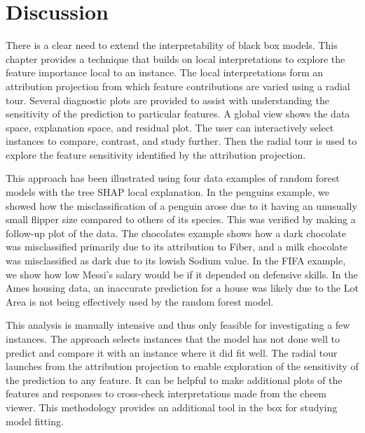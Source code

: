 \documentclass[11pt,twoside]{article}
\begin{document}
\hypertarget{sec:cheemdiscussion}{%
\section{Discussion}\label{sec:cheemdiscussion}}

There is a clear need to extend the interpretability of black box models. This chapter provides a technique that builds on local interpretations to explore the feature importance local to an instance. The local interpretations form an attribution projection from which feature contributions are varied using a radial tour. Several diagnostic plots are provided to assist with understanding the sensitivity of the prediction to particular features. A global view shows the data space, explanation space, and residual plot. The user can interactively select instances to compare, contrast, and study further. Then the radial tour is used to explore the feature sensitivity identified by the attribution projection.

This approach has been illustrated using four data examples of random forest models with the tree SHAP local explanation. In the penguins example, we showed how the misclassification of a penguin arose due to it having an unusually small flipper size compared to others of its species. This was verified by making a follow-up plot of the data. The chocolates example shows how a dark chocolate was misclassified primarily due to its attribution to Fiber, and a milk chocolate was misclassified as dark due to its lowish Sodium value. In the FIFA example, we show how low Messi's salary would be if it depended on defensive skills. In the Ames housing data, an inaccurate prediction for a house was likely due to the Lot Area is not being effectively used by the random forest model.

This analysis is manually intensive and thus only feasible for investigating a few instances. The approach selects instances that the model has not done well to predict and compare it with an instance where it did fit well. The radial tour launches from the attribution projection to enable exploration of the sensitivity of the prediction to any feature. It can be helpful to make additional plots of the features and responses to cross-check interpretations made from the cheem viewer. This methodology provides an additional tool in the box for studying model fitting.
\end{document}
